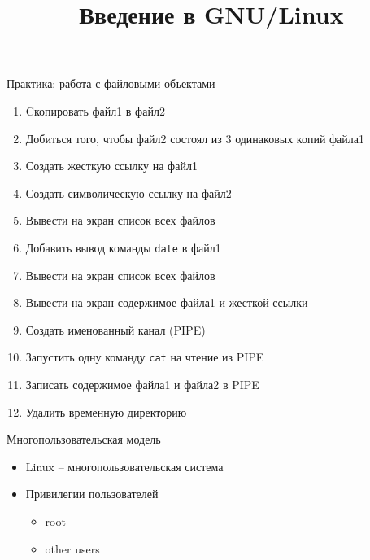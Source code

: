 
\title{Введение в GNU/Linux}








\frame{
	\frametitle{}
	\titlepage
	\vspace{-0.5cm}
	\begin{center}
	\end{center}
}
\frame{
	\tableofcontents
}

\begin{frame}{Практика: работа с файловыми объектами}
	\begin{enumerate}
		\item Cкопировать файл1 в файл2
			\pause
		\item Добиться того, чтобы файл2 состоял из 3 одинаковых копий файла1
		\item Создать жесткую ссылку на файл1
		\item Создать символическую ссылку на файл2
		\item Вывести на экран список всех файлов
			\pause
		\item Добавить вывод команды {\tt date} в файл1
		\item Вывести на экран список всех файлов
		\item Вывести на экран содержимое файла1 и жесткой ссылки
		\item Создать именованный канал (PIPE)
		\item Запустить одну команду {\tt cat} на чтение из PIPE
		\item Записать содержимое файла1 и файла2 в PIPE
		\item Удалить временную директорию
	\end{enumerate}
\end{frame}
\begin{frame}{Многопользовательская модель}   
 \begin{itemize}
   \item Linux -- многопользовательская система
   \item Привилегии пользователей
     \begin{itemize}
       \item root
       \item other users
      \end{itemize}
     \end{itemize}
\end{frame}
